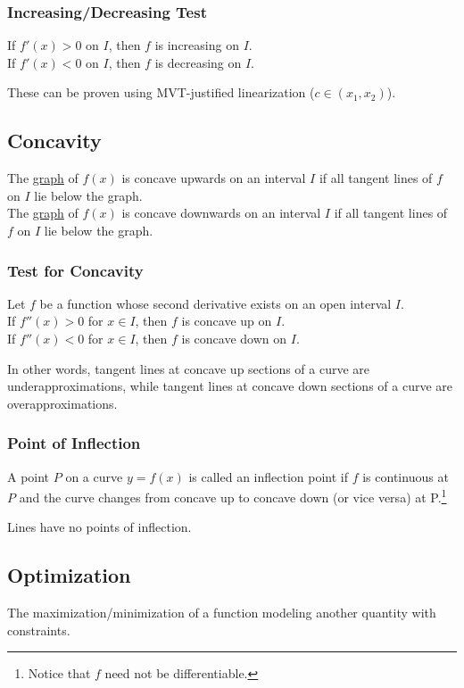 \documentclass{article}
\begin{document}
\subsubsection{Increasing/Decreasing Test}\label{inc-dec-test}
If $f'(x) > 0$ on $I$, then $f$ is increasing on $I$.\\
If $f'(x) < 0$ on $I$, then $f$ is decreasing on $I$.

These can be proven using MVT-justified linearization ($c \in (x_1,x_2)$).

\subsection{Concavity}
The \underline{graph} of $f(x)$ is concave upwards on an interval $I$ if all tangent lines of $f$ on $I$ lie below the graph.\\
The \underline{graph} of $f(x)$ is concave downwards on an interval $I$ if all tangent lines of $f$ on $I$ lie below the graph.

\subsubsection{Test for Concavity}
Let $f$ be a function whose second derivative exists on an open interval $I$.\\
If $f''(x) > 0$ for $x \in I$, then $f$ is concave up on $I$.\\
If $f''(x) < 0$ for $x \in I$, then $f$ is concave down on $I$.

In other words, tangent lines at concave up sections of a curve are underapproximations, while tangent lines at concave down sections of a curve are overapproximations.

\subsubsection{Point of Inflection} A point $P$ on a curve $y=f(x)$ is called an inflection point if $f$ is continuous at $P$ and the curve changes from concave up to concave down (or vice versa) at P.\footnote{Notice that $f$ need not be differentiable.}

Lines have no points of inflection.

\subsection{Optimization}
The maximization/minimization of a function modeling another quantity with constraints.
\end{document}
